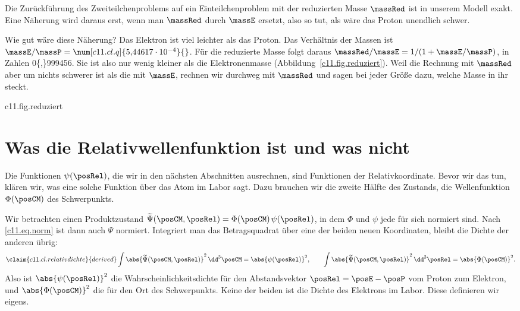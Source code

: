 \begin{merksatz}
  Die Zurückführung des Zweiteilchenproblems auf ein Einteilchenproblem mit der
  reduzierten Masse $\massRed$ ist in unserem Modell exakt. Eine Näherung wird daraus
  erst, wenn man $\massRed$ durch $\massE$ ersetzt, also so tut, als wäre das Proton
  unendlich schwer.
\end{merksatz}

Wie gut wäre diese Näherung? Das Elektron ist viel leichter als das Proton. Das
Verhältnis der Massen ist $\massE/\massP = \num[c11.cl.q]{5{,}44617 \cdot 10^{-4}}{}$.
Für die reduzierte Masse folgt daraus $\massRed/\massE = 1/(1 + \massE/\massP)$, in
Zahlen \num[c11.cl.mu-ratio]{0{,}999456}{}. Sie ist also nur wenig kleiner als die
Elektronenmasse (Abbildung~\ref{c11.fig.reduziert}). Weil die Rechnung mit $\massRed$ aber um nichts schwerer ist
als die mit $\massE$, rechnen wir durchweg mit $\massRed$ und sagen bei jeder Größe
dazu, welche Masse in ihr steckt.

\begin{tpcfigure}{c11.fig.reduziert}
  \caption{Die reduzierte Masse nach , in Einheiten der Elektronenmasse, als Funktion des Massenverhältnisses; die waagerechte Achse ist logarithmisch. Bei gleichen Massen ist $\massRed$ die Hälfte von $\massE$. Je schwerer das zweite Teilchen, desto näher kommt $\massRed$ der Elektronenmasse; der rechte Punkt ist Wasserstoff.}
\end{tpcfigure}

\section{Was die Relativwellenfunktion ist und was nicht}\label{c11.s3}

Die Funktionen $\psi(\posRel)$, die wir in den nächsten Abschnitten ausrechnen, sind
Funktionen der Relativkoordinate. Bevor wir das tun, klären wir, was eine solche
Funktion über das Atom im Labor sagt. Dazu brauchen wir die zweite Hälfte des Zustands,
die Wellenfunktion $\Phi(\posCM)$ des Schwerpunkts.

Wir betrachten einen Produktzustand
$\widetilde{\Psi}(\posCM, \posRel) = \Phi(\posCM)\,\psi(\posRel)$, in dem $\Phi$ und
$\psi$ jede für sich normiert sind. Nach \eqref{c11.eq.norm} ist dann auch $\Psi$
normiert. Integriert man das Betragsquadrat über eine der beiden neuen Koordinaten,
bleibt die Dichte der anderen übrig:
\begin{equation}\label{c11.eq.relativdichte}\claim{c11.cl.relativdichte}{derived}
  \int \abs{\widetilde{\Psi}(\posCM, \posRel)}^2 \,\dd^3\posCM = \abs{\psi(\posRel)}^2,
  \qquad
  \int \abs{\widetilde{\Psi}(\posCM, \posRel)}^2 \,\dd^3\posRel = \abs{\Phi(\posCM)}^2.
\end{equation}
Also ist $\abs{\psi(\posRel)}^2$ die Wahrscheinlichkeitsdichte für den Abstandsvektor
$\posRel = \posE - \posP$ vom Proton zum Elektron, und $\abs{\Phi(\posCM)}^2$ die für
den Ort des Schwerpunkts. Keine der beiden ist die Dichte des Elektrons im Labor. Diese
definieren wir eigens.

